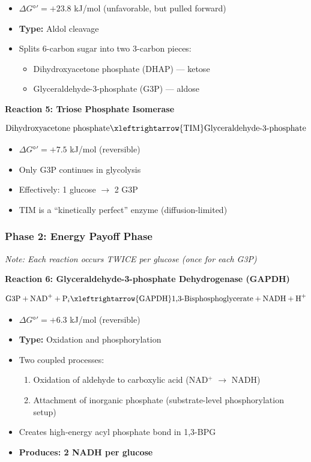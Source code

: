 \begin{itemize}
    \item $\Delta G°' = +23.8$ kJ/mol (unfavorable, but pulled forward)
    \item \textbf{Type:} Aldol cleavage
    \item Splits 6-carbon sugar into two 3-carbon pieces:
    \begin{itemize}
        \item Dihydroxyacetone phosphate (DHAP) — ketose
        \item Glyceraldehyde-3-phosphate (G3P) — aldose
    \end{itemize}
\end{itemize}

\textbf{Reaction 5: Triose Phosphate Isomerase}

\[
\text{Dihydroxyacetone phosphate} \xleftrightarrow{\text{TIM}} \text{Glyceraldehyde-3-phosphate}
\]

\begin{itemize}
    \item $\Delta G°' = +7.5$ kJ/mol (reversible)
    \item Only G3P continues in glycolysis
    \item Effectively: 1 glucose $\rightarrow$ 2 G3P
    \item TIM is a ``kinetically perfect'' enzyme (diffusion-limited)
\end{itemize}

\begin{center}
\end{center}

\subsubsection{Phase 2: Energy Payoff Phase}

\textit{Note: Each reaction occurs TWICE per glucose (once for each G3P)}

\textbf{Reaction 6: Glyceraldehyde-3-phosphate Dehydrogenase (GAPDH)}

\[
\text{G3P} + \text{NAD}^+ + \text{P}_i \xleftrightarrow{\text{GAPDH}} \text{1,3-Bisphosphoglycerate} + \text{NADH} + \text{H}^+
\]

\begin{itemize}
    \item $\Delta G°' = +6.3$ kJ/mol (reversible)
    \item \textbf{Type:} Oxidation and phosphorylation
    \item Two coupled processes:
    \begin{enumerate}
        \item Oxidation of aldehyde to carboxylic acid (NAD$^+$ $\rightarrow$ NADH)
        \item Attachment of inorganic phosphate (substrate-level phosphorylation setup)
    \end{enumerate}
    \item Creates high-energy acyl phosphate bond in 1,3-BPG
    \item \textbf{Produces: 2 NADH per glucose}
\end{itemize}

